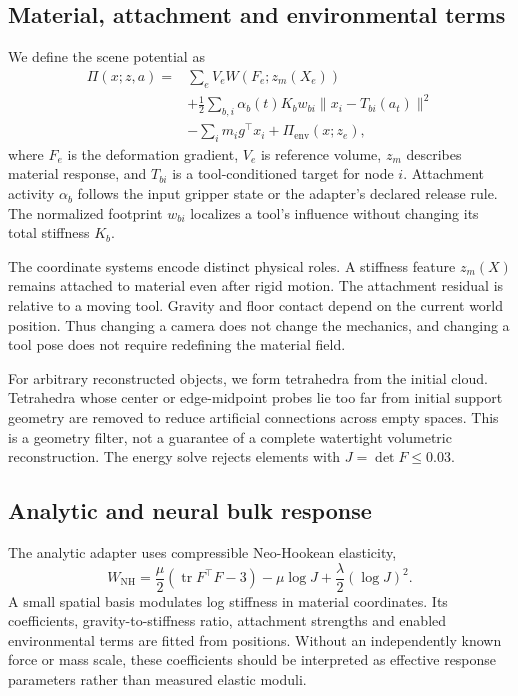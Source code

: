 \documentclass[10pt,twocolumn,letterpaper]{article}
\begin{document}
\subsection{Material, attachment and environmental terms}
We define the scene potential as
\begin{align}
\Pi(x;z,a)={}&\sum_e V_e W(F_e;z_m(X_e))\nonumber\\
&+\frac12\sum_{b,i}\alpha_b(t)K_b w_{bi}\|x_i-T_{bi}(a_t)\|^2\nonumber\\
&-\sum_i m_i g^\top x_i+\Pi_{\mathrm{env}}(x;z_e),\label{eq:potential}
\end{align}
where $F_e$ is the deformation gradient, $V_e$ is reference volume, $z_m$ describes material response, and $T_{bi}$ is a tool-conditioned target for node $i$. Attachment activity $\alpha_b$ follows the input gripper state or the adapter's declared release rule. The normalized footprint $w_{bi}$ localizes a tool's influence without changing its total stiffness $K_b$.

The coordinate systems encode distinct physical roles. A stiffness feature $z_m(X)$ remains attached to material even after rigid motion. The attachment residual is relative to a moving tool. Gravity and floor contact depend on the current world position. Thus changing a camera does not change the mechanics, and changing a tool pose does not require redefining the material field.

For arbitrary reconstructed objects, we form tetrahedra from the initial cloud. Tetrahedra whose center or edge-midpoint probes lie too far from initial support geometry are removed to reduce artificial connections across empty spaces. This is a geometry filter, not a guarantee of a complete watertight volumetric reconstruction. The energy solve rejects elements with $J=\det F\leq0.03$.

\subsection{Analytic and neural bulk response}
The analytic adapter uses compressible Neo-Hookean elasticity,
\begin{equation}
W_{\mathrm{NH}}=\frac\mu2(\operatorname{tr}F^\top F-3)-\mu\log J+\frac\lambda2(\log J)^2.
\end{equation}
A small spatial basis modulates log stiffness in material coordinates. Its coefficients, gravity-to-stiffness ratio, attachment strengths and enabled environmental terms are fitted from positions. Without an independently known force or mass scale, these coefficients should be interpreted as effective response parameters rather than measured elastic moduli.
\end{document}
